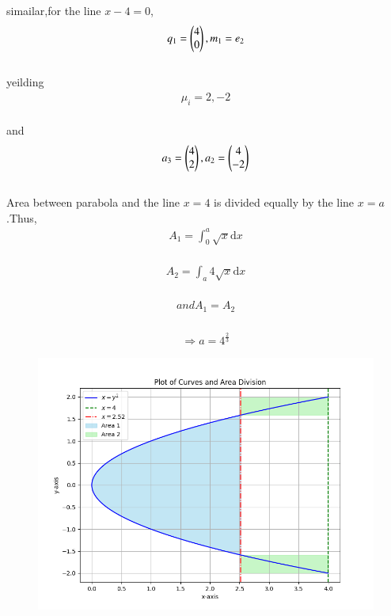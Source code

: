 \documentclass[journal]{IEEEtran}
\begin{document}
  simailar,for the line $x-4=0$,\\
  \begin{align}
                      q_{1}=\begin{pmatrix}
                                    4\\
                                    0\end{pmatrix},m_{1}=e_{2}
  \end{align}\\
  yeilding\\
  \begin{align}
               \mu_{i}=2,-2
  \end{align}\\
   and\\
   \begin{align}
                  a_{3}=\begin{pmatrix}
                               4\\
                               2\end{pmatrix},a_{2}=\begin{pmatrix}4\\
                                               -2\end{pmatrix}
   \end{align}\\
   Area between parabola and the line $x=4$  is divided equally by the line $x=a$.Thus,\\
   \begin{align}
                A_{1}=\int_0^a \sqrt{x}\mathrm{d}x
   \end{align}\\
   \begin{align}
                  A_{2}=\int_a4 \sqrt{x}\mathrm{d}x
   \end{align}\\
    \begin{align}
                 and A_{1}=A_{2}
    \end{align}\\
    \begin{align}
                  \Rightarrow{a=4^\frac{2}{3}}
    \end{align}
\begin{figure}[h!]
        \centering
        \includegraphics[width=0.7\linewidth]{fig/fig.png}
		\caption{}
        \label{stemplot}
\end{figure}

    
 
\end{document}
